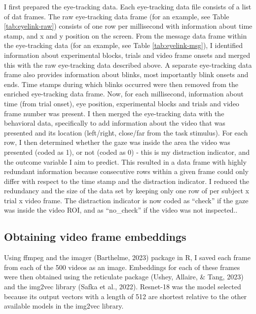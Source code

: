\documentclass[
  man]{apa6}
\begin{document}
I first prepared the eye-tracking data. Each eye-tracking data file consists of a list of dat frames. The raw eye-tracking data frame (for an example, see Table \ref{tab:eyelink-raw}) consists of one row per millisecond with information about time stamp, and x and y position on the screen. From the message data frame within the eye-tracking data (for an example, see Table \ref{tab:eyelink-msg}), I identified information about experimental blocks, trials and video frame onsets and merged this with the raw eye-tracking data described above. A separate eye-tracking data frame also provides information about blinks, most importantly blink onsets and ends. Time stamps during which blinks occurred were then removed from the enriched eye-tracking data frame. Now, for each millisecond, information about time (from trial onset), eye position, experimental blocks and trials and video frame number was present. I then merged the eye-tracking data with the behavioral data, specifically to add information about the video that was presented and its location (left/right, close/far from the task stimulus). For each row, I then determined whether the gaze was inside the area the video was presented (coded as 1), or not (coded as 0) - this is my distraction indicator, and the outcome variable I aim to predict. This resulted in a data frame with highly redundant information because consecutive rows within a given frame could only differ with respect to the time stamp and the distraction indicator. I reduced the redundancy and the size of the data set by keeping only one row of per subject x trial x video frame. The distraction indicator is now coded as ``check'' if the gaze was inside the video ROI, and as ``no\_check'' if the video was not inspected..

\hypertarget{obtaining-video-frame-embeddings}{%
\subsection{Obtaining video frame embeddings}\label{obtaining-video-frame-embeddings}}

Using ffmpeg and the imager (Barthelme, 2023) package in R, I saved each frame from each of the 500 videos as an image. Embeddings for each of these frames were then obtained using the reticulate package (Ushey, Allaire, \& Tang, 2023) and the img2vec library (Safka et al., 2022). Resnet-18 was the model selected because its output vectors with a length of 512 are shortest relative to the other available models in the img2vec library.
\end{document}
